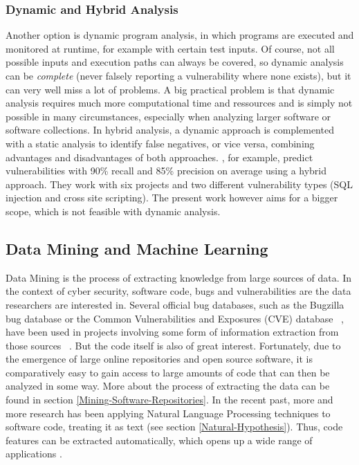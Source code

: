 \documentclass[
	a4paper,
	pagesize,
	pdftex,
	12pt,
	twoside, %
	BCOR=5mm, %
	ngerman,
	fleqn,
	final,
	]{scrartcl}
\begin{document}
\subsubsection{Dynamic and Hybrid Analysis}
Another option is dynamic program analysis, in which programs are executed and monitored at runtime, for example with certain test inputs. Of course, not all possible inputs and execution paths can always be covered, so dynamic analysis can be \textit{complete} (never falsely reporting a vulnerability where none exists), but it can very well miss a lot of problems. A big practical problem is that dynamic analysis requires much more computational time and ressources and is simply not possible in many circumstances, especially when analyzing larger software or software collections.
In hybrid analysis, a dynamic approach is complemented with a static analysis to identify false negatives, or vice versa, combining advantages and disadvantages of both approaches. \cite{Shar.2013}, for example, predict vulnerabilities with 90{\%} recall and 85{\%} precision on average using a hybrid approach. They work with six projects and two different vulnerability types (SQL injection and cross site scripting). The present work however aims for a bigger scope, which is not feasible with dynamic analysis.\\



\subsection{Data Mining and Machine Learning}
Data Mining is the process of extracting knowledge from large sources of data. %
In the context of cyber security, software code, bugs and vulnerabilities are the data researchers are interested in. Several official bug databases, such as the Bugzilla bug database or the Common Vulnerabilities and Exposures (CVE) database ~\cite{CVE}, have been used in projects involving some form of information extraction from those sources ~\cite{Wijayasekara.2012}. But the code itself is also of great interest. Fortunately, due to the emergence of large online repositories and open source software, it is comparatively easy to gain access to large amounts of code that can then be analyzed in some way. More about the process of extracting the data can be found in section \ref{Mining-Software-Repositories}. In the recent past, more and more research has been applying Natural Language Processing techniques to software code, treating it as text (see section \ref{Natural-Hypothesis}). Thus, code features can be extracted automatically, which opens up a wide range of applications \cite{Dam.2017}.\\
\end{document}
